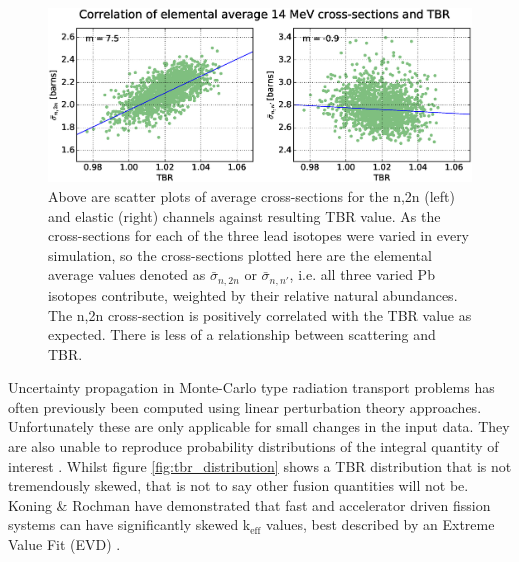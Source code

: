 \begin{figure}[ht]
  \centering
	\includegraphics[width=\textwidth]{pb_tbr_n2n_el_corr}
	\caption{Above are scatter plots of average cross-sections for the n,2n (left) and elastic (right) channels against resulting TBR value. As the cross-sections for each of the three lead isotopes were varied in every simulation, so the cross-sections plotted here are the elemental average values denoted as $\bar{\sigma}_{n,2n}$ or $\bar{\sigma}_{n,n'}$, i.e. all three varied Pb isotopes contribute, weighted by their relative natural abundances. The n,2n cross-section is positively correlated with the TBR value as expected. There is less of a relationship between scattering and TBR.}
	\label{fig:tbr_n2n}
\end{figure}



Uncertainty propagation in Monte-Carlo type radiation transport problems has often previously been computed using linear perturbation theory approaches. Unfortunately these are only applicable for small changes in the input data. They are also unable to reproduce probability distributions of the integral quantity of interest \cite{Rising2012}. Whilst figure \ref{fig:tbr_distribution} shows a TBR distribution that is not tremendously skewed, that is not to say other fusion quantities will not be. Koning \& Rochman have demonstrated that fast and accelerator driven fission systems can have significantly skewed k$_{\mbox{eff}}$ values, best described by an Extreme Value Fit (EVD) \cite{Koning2008}.

